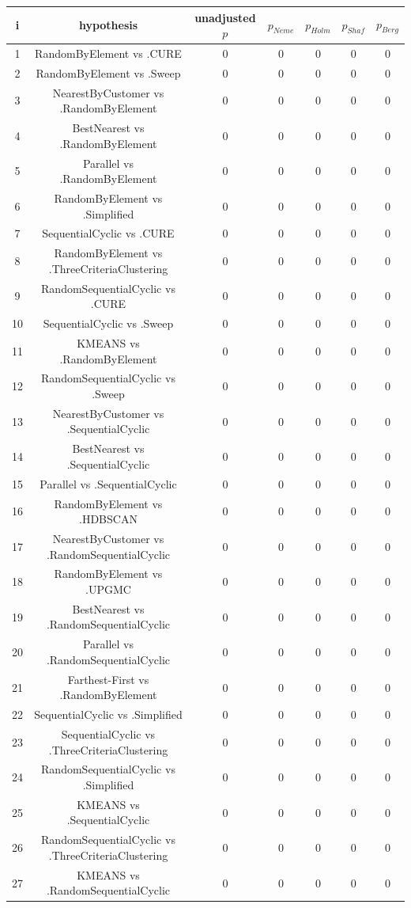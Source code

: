 \documentclass[a4paper,10pt]{article}
\begin{document}
\begin{landscape}
\begin{table}[!htp]
\centering\scriptsize
\begin{tabular}{ccccccc}
i&hypothesis&unadjusted $p$&$p_{Neme}$&$p_{Holm}$&$p_{Shaf}$&$p_{Berg}$\\
\hline1&RandomByElement vs .CURE&0&0&0&0&0\\
2&RandomByElement vs .Sweep&0&0&0&0&0\\
3&NearestByCustomer vs .RandomByElement&0&0&0&0&0\\
4&BestNearest vs .RandomByElement&0&0&0&0&0\\
5&Parallel vs .RandomByElement&0&0&0&0&0\\
6&RandomByElement vs .Simplified&0&0&0&0&0\\
7&SequentialCyclic vs .CURE&0&0&0&0&0\\
8&RandomByElement vs .ThreeCriteriaClustering&0&0&0&0&0\\
9&RandomSequentialCyclic vs .CURE&0&0&0&0&0\\
10&SequentialCyclic vs .Sweep&0&0&0&0&0\\
11&KMEANS vs .RandomByElement&0&0&0&0&0\\
12&RandomSequentialCyclic vs .Sweep&0&0&0&0&0\\
13&NearestByCustomer vs .SequentialCyclic&0&0&0&0&0\\
14&BestNearest vs .SequentialCyclic&0&0&0&0&0\\
15&Parallel vs .SequentialCyclic&0&0&0&0&0\\
16&RandomByElement vs .HDBSCAN&0&0&0&0&0\\
17&NearestByCustomer vs .RandomSequentialCyclic&0&0&0&0&0\\
18&RandomByElement vs .UPGMC&0&0&0&0&0\\
19&BestNearest vs .RandomSequentialCyclic&0&0&0&0&0\\
20&Parallel vs .RandomSequentialCyclic&0&0&0&0&0\\
21&Farthest-First vs .RandomByElement&0&0&0&0&0\\
22&SequentialCyclic vs .Simplified&0&0&0&0&0\\
23&SequentialCyclic vs .ThreeCriteriaClustering&0&0&0&0&0\\
24&RandomSequentialCyclic vs .Simplified&0&0&0&0&0\\
25&KMEANS vs .SequentialCyclic&0&0&0&0&0\\
26&RandomSequentialCyclic vs .ThreeCriteriaClustering&0&0&0&0&0\\
27&KMEANS vs .RandomSequentialCyclic&0&0&0&0&0\\

\end{tabular}
\end{table}
\end{landscape}
\end{document}
